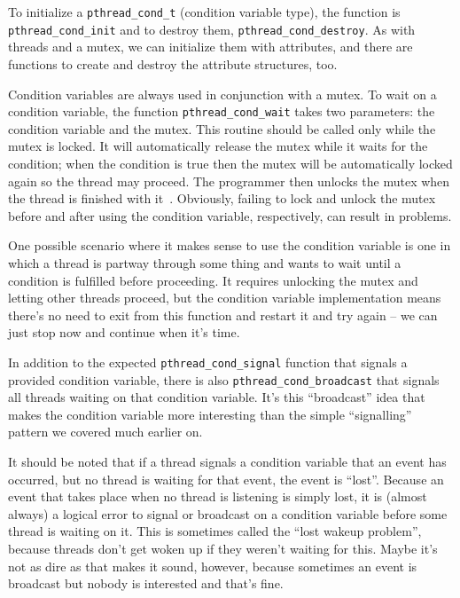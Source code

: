 To initialize a \texttt{pthread\_cond\_t} (condition variable type), the function is \texttt{pthread\_cond\_init} and to destroy them, \texttt{pthread\_cond\_destroy}. As with threads and a mutex, we can initialize them with attributes, and there are functions to create and destroy the attribute structures, too. 

Condition variables are always used in conjunction with a mutex. To wait on a condition variable, the function \texttt{pthread\_cond\_wait} takes two parameters: the condition variable and the mutex. This routine should be called only while the mutex is locked. It will automatically release the mutex while it waits for the condition; when the condition is true then the mutex will be automatically locked again so the thread may proceed. The programmer then unlocks the mutex when the thread is finished with it~\cite{pthreads}. Obviously, failing to lock and unlock the mutex before and after using the condition variable, respectively, can result in problems.

One possible scenario where it makes sense to use the condition variable is one in which a thread is partway through some thing and wants to wait until a condition is fulfilled before proceeding. It requires unlocking the mutex and letting other threads proceed, but the condition variable implementation means there's no need to exit from this function and restart it and try again -- we can just stop now and continue when it's time.

In addition to the expected \texttt{pthread\_cond\_signal} function that signals a provided condition variable, there is also \texttt{pthread\_cond\_broadcast} that signals all threads waiting on that condition variable. It's this ``broadcast'' idea that makes the condition variable more interesting than the simple ``signalling'' pattern we covered much earlier on.

It should be noted that if a thread signals a condition variable that an event has occurred, but no thread is waiting for that event, the event is ``lost''.  Because an event that takes place when no thread is listening is simply lost, it is (almost always) a logical error to signal or broadcast on a condition variable before some thread is waiting on it. This is sometimes called the ``lost wakeup problem'', because threads don't get woken up if they weren't waiting for this. Maybe it's not as dire as that makes it sound, however, because sometimes an event is broadcast but nobody is interested and that's fine.

